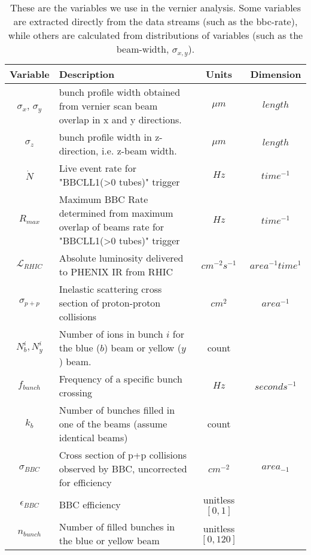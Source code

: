 \begin{table}
\centering
\begin{tabular}{c p{8cm} c c }
\toprule
\textbf{Variable} & \textbf{Description} & \textbf{Units} & \textbf{Dimension} \\
\midrule 
$\sigma_{x}$, $\sigma_{y}$ & bunch profile width obtained from vernier scan beam overlap in x and y directions. & $\mu m$ & $length$ \\
$\sigma_{z}$ & bunch profile width in z-direction, i.e. z-beam width. & $\mu m$ & $length$ \\
$\dot{N}$ & Live event rate for "BBCLL1(\textgreater0 tubes)" trigger & $Hz$ & $time^{-1}$ \\
$R_{max}$ & Maximum BBC Rate determined from maximum overlap of beams rate for "BBCLL1(\textgreater0 tubes)" trigger & $Hz$ & $time^{-1}$ \\
$\mathcal{L}_{RHIC}$ & Absolute luminosity delivered to PHENIX IR from RHIC & $cm^{-2}s^{-1}$ & $area^{-1}time^{1}$ \\
$\sigma_{p+p} $ & Inelastic scattering cross section of proton-proton collisions & $cm^{2}$ & $area^{-1}$ \\
$N_{b}^{i},N_{y}^{i}$ & Number of ions in bunch $i$ for the blue ($b$) beam or yellow ($y$) beam. & count & \\
$f_{bunch}$ & Frequency of a specific bunch crossing & $Hz$ & $seconds^{-1}$ \\
$k_{b}$ & Number of bunches filled in one of the beams (assume identical beams) & count & \\
$\sigma_{BBC}$ & Cross section of p+p collisions observed by BBC, uncorrected for efficiency & $cm^{-2}$ & $area_{-1}$ \\
$\epsilon_{BBC}$ & BBC efficiency & unitless $[0,1]$ & \\
$n_{bunch}$ & Number of filled bunches in the blue or yellow beam & unitless $[0,120]$ & \\
\bottomrule
\end{tabular}
\caption{These are the variables we use in the vernier analysis. Some variables are
extracted directly from the data streams (such as the bbc-rate), while others are
calculated from distributions of variables (such as the beam-width, $\sigma_{x,y}$). }
\label{tab:ana_vars}
\end{table}
